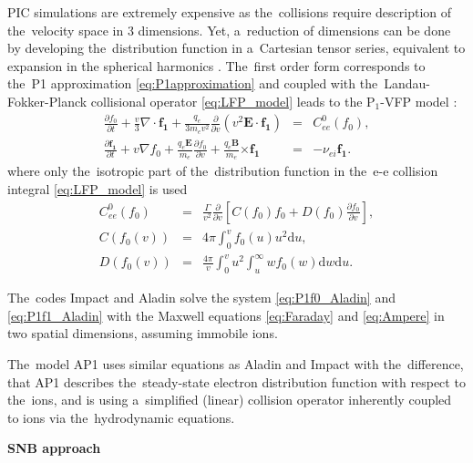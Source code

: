 \documentclass[
 aps,
 jmp,
 amsmath,amssymb,
 twocolumn,
]{revtex4-1}
\newcommand{\vect}[1]{\boldsymbol{#1}}
\newcommand{\dI}{\text{d}}
\newcommand{\nuei}{\nu_{ei}}
\newcommand{\vmag}{v}
\newcommand{\E}{\vect{E}}
\newcommand{\B}{\vect{B}}
\newcommand{\qe}{q_e}
\newcommand{\me}{m_e}
\newcommand{\fzero}{f_0}
\newcommand{\fone}{{\vect{f_1}}}
\begin{document}
PIC simulations are extremely expensive as the~collisions require description 
of the~velocity space in 3 dimensions. Yet, a~reduction of dimensions can be 
done by developing the~distribution function in a~Cartesian tensor series, 
equivalent to expansion in the spherical harmonics \cite{Johnston_PR1960}.
The~first order form corresponds to the~P1 approximation 
\eqref{eq:P1approximation} and coupled with
the~Landau-Fokker-Planck collisional operator 
\eqref{eq:LFP_model} leads to the P$_1$-VFP model 
\cite{Johnston_PR1960, Kingham_JCP2004, CEA-Aladin}:
\begin{eqnarray}
\frac{\partial \fzero}{\partial t}+\frac{\vmag}{3}\nabla \cdot \fone
+\frac{\qe}{3\me\vmag^2}\frac{\partial}{\partial \vmag}(\vmag^2\E\cdot \fone)
&=&
C^0_{ee}(\fzero) ,
 \label{eq:P1f0_Aladin}\\
\frac{\partial \fone}{\partial t}+\vmag\nabla \fzero
+ \frac{\qe\E}{\me}\frac{\partial \fzero}{\partial \vmag}
+\frac{\qe\B}{\me}\vect{\times} \fone 
&=&
- \nuei\fone .
\label{eq:P1f1_Aladin}
\end{eqnarray}
where only the~isotropic part of the~distribution function in 
the~e-e collision integral \eqref{eq:LFP_model} is used
\begin{eqnarray} 
C^0_{ee}(\fzero) &=& \frac{\Gamma}{v^2}\frac{\partial}{\partial \vmag}
\left[C(f_0)f_0+D(\fzero)\frac{\partial \fzero}{\partial \vmag}\right] ,
\label{eq:C0_collision_operator}
\\
C(\fzero(\vmag)) &=& 4\pi\int_0^\vmag \fzero(u) u^2 \dI u ,
\nonumber
\\
D(\fzero(\vmag)) &=& \frac{4\pi}{\vmag}\int_0^\vmag u^2\int_u^\infty w \fzero(w) 
\dI w \dI u .
\nonumber
\end{eqnarray}

The~codes Impact \cite{Kingham_JCP2004} and Aladin \cite{CEA-Aladin} 
solve the system \eqref{eq:P1f0_Aladin} 
and \eqref{eq:P1f1_Aladin} with the Maxwell equations  
\eqref{eq:Faraday} and \eqref{eq:Ampere} in two spatial dimensions, 
assuming immobile ions.

The~model AP1 uses similar equations as Aladin
and Impact with the~difference, that AP1 describes the~steady-state 
electron distribution function with respect to the~ions,
and is using a~simplified (linear) collision operator inherently
coupled to ions via the~hydrodynamic equations.


\textbf{SNB approach}
\end{document}
